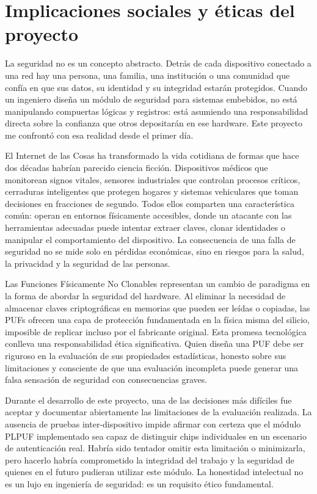 \chapter{Implicaciones sociales y éticas del proyecto}
\label{ch:anexo_etica}

La seguridad no es un concepto abstracto. Detrás de cada dispositivo conectado
a una red hay una persona, una familia, una institución o una comunidad que
confía en que sus datos, su identidad y su integridad estarán protegidos. Cuando
un ingeniero diseña un módulo de seguridad para sistemas embebidos, no está
manipulando compuertas lógicas y registros: está asumiendo una responsabilidad
directa sobre la confianza que otros depositarán en ese hardware. Este proyecto
me confrontó con esa realidad desde el primer día.

El Internet de las Cosas ha transformado la vida cotidiana de formas que hace
dos décadas habrían parecido ciencia ficción. Dispositivos médicos que monitorean
signos vitales, sensores industriales que controlan procesos críticos, cerraduras
inteligentes que protegen hogares y sistemas vehiculares que toman decisiones en
fracciones de segundo. Todos ellos comparten una característica común: operan en
entornos físicamente accesibles, donde un atacante con las herramientas adecuadas
puede intentar extraer claves, clonar identidades o manipular el comportamiento
del dispositivo. La consecuencia de una falla de seguridad no se mide solo en
pérdidas económicas, sino en riesgos para la salud, la privacidad y la seguridad
de las personas.

Las Funciones Físicamente No Clonables representan un cambio de paradigma en la
forma de abordar la seguridad del hardware. Al eliminar la necesidad de almacenar
claves criptográficas en memorias que pueden ser leídas o copiadas, las PUFs
ofrecen una capa de protección fundamentada en la física misma del silicio,
imposible de replicar incluso por el fabricante original. Esta promesa tecnológica
conlleva una responsabilidad ética significativa. Quien diseña una PUF debe ser
riguroso en la evaluación de sus propiedades estadísticas, honesto sobre sus
limitaciones y consciente de que una evaluación incompleta puede generar una falsa
sensación de seguridad con consecuencias graves.

Durante el desarrollo de este proyecto, una de las decisiones más difíciles fue
aceptar y documentar abiertamente las limitaciones de la evaluación realizada. La
ausencia de pruebas inter-dispositivo impide afirmar con certeza que el módulo
PLPUF implementado sea capaz de distinguir chips individuales en un escenario de
autenticación real. Habría sido tentador omitir esta limitación o minimizarla,
pero hacerlo habría comprometido la integridad del trabajo y la seguridad de
quienes en el futuro pudieran utilizar este módulo. La honestidad intelectual no
es un lujo en ingeniería de seguridad: es un requisito ético fundamental.


